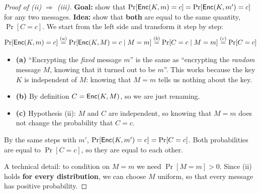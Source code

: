 \begin{proof}[Proof of (ii) $\Rightarrow$ (iii)]
  \textbf{Goal:} show that $\Pr[\mathsf{Enc}(K, m) = c] = \Pr[\mathsf{Enc}(K, m') = c]$ for any two messages. \textbf{Idea:} show that \textbf{both} are equal to the same quantity, $\Pr[C = c]$. We start from the left side and transform it step by step:
  \[
    \Pr[\mathsf{Enc}(K, m) = c] \overset{(a)}{=} \Pr[\mathsf{Enc}(K, M) = c \mid M = m] \overset{(b)}{=} \Pr[C = c \mid M = m] \overset{(c)}{=} \Pr[C = c]
  \]
  \begin{itemize}
    \item \textbf{(a)} ``Encrypting the \textit{fixed} message $m$'' is the same as ``encrypting the \textit{random} message $M$, knowing that it turned out to be $m$''. This works because the key $K$ is independent of $M$: knowing that $M = m$ tells us nothing about the key.
    \item \textbf{(b)} By definition $C = \mathsf{Enc}(K, M)$, so we are just renaming.
    \item \textbf{(c)} Hypothesis (ii): $M$ and $C$ are independent, so knowing that $M = m$ does not change the probability that $C = c$.
  \end{itemize}
  By the same steps with $m'$, $\Pr[\mathsf{Enc}(K, m') = c] = \Pr[C = c]$. Both probabilities are equal to $\Pr[C = c]$, so they are equal to each other.

  A technical detail: to condition on $M = m$ we need $\Pr[M = m] > 0$. Since (ii) holds \textbf{for every distribution}, we can choose $M$ uniform, so that every message has positive probability.
\end{proof}

